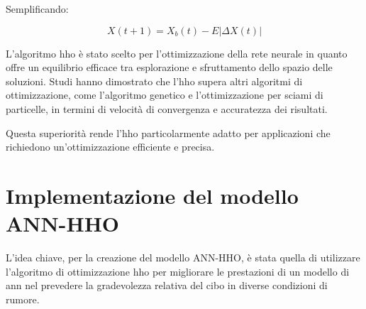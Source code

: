 Semplificando:

\begin{equation}
      X(t+1) = X_{b}(t) - E|\Delta X(t)|
\end{equation}

\newpage
L'algoritmo \gls{hho} è stato scelto per l'ottimizzazione della rete neurale in quanto offre un equilibrio efficace tra esplorazione e sfruttamento dello spazio delle soluzioni. Studi hanno dimostrato che l'\gls{hho} supera altri algoritmi di ottimizzazione, come l'algoritmo genetico e l'ottimizzazione per sciami di particelle, in termini di velocità di convergenza e accuratezza dei risultati. \cite{9400357}

Questa superiorità rende l'\gls{hho} particolarmente adatto per applicazioni che richiedono un'ottimizzazione efficiente e precisa.

\section{Implementazione del modello ANN-HHO}
\noindent

L'idea chiave, per la creazione del modello ANN-HHO, è stata quella di utilizzare l'algoritmo di ottimizzazione \gls{hho} per migliorare le prestazioni di un modello di \gls{ann} nel prevedere la gradevolezza relativa del cibo in  diverse condizioni di rumore.

